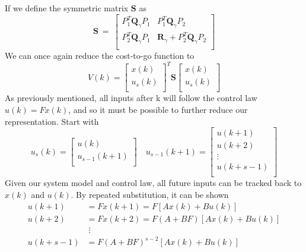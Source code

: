 If we define the symmetric matrix $\textbf{S}$ as
\begin{equation}
    \textbf{S}\ =\ \left[\begin{matrix}P_1^T\textbf{Q}_\gamma P_1&P_1^T\textbf{Q}_\gamma P_2\\P_2^T\textbf{Q}_\gamma P_1&\textbf{R}_\gamma+P_2^T\textbf{Q}_\gamma P_2\\\end{matrix}\right]
\end{equation}
We can once again reduce the cost-to-go function to
\begin{equation}
    V\left(k\right)={\left[\begin{matrix}x\left(k\right)\\u_s\left(k\right)\\\end{matrix}\right]}^T\textbf{S}\left[\begin{matrix}x\left(k\right)\\u_s\left(k\right)\\\end{matrix}\right]
    \label{eq:xus_cost_to_go}
\end{equation}
As previously mentioned, all inputs after k will follow the control law $u\left(k\right)=Fx\left(k\right)$, and so it must be possible to further reduce our representation. Start with
\begin{equation}
    u_s\left(k\right)=\left[\begin{matrix}u\left(k\right)\\u_{s-1}\left(k+1\right)\\\end{matrix}\right]	
    \quad
    u_{s-1}\left(k+1\right)=\left[\begin{matrix}u\left(k+1\right)\\u\left(k+2\right)\\\vdots\\u\left(k+s-1\right)\\\end{matrix}\right]
    \label{eq:u_s_and_u_s_1}
\end{equation}
Given our system model and control law, all future inputs can be tracked back to $x\left(k\right)$ and $u\left(k\right)$. By repeated substitution, it can be shown
\begin{align}
    u(k+1) &= Fx(k+1) = F\left[Ax(k) + Bu(k)\right] \nonumber \\
    u(k+2) &= Fx(k+2) = F(A+BF)\left[Ax(k) + Bu(k)\right] \nonumber \\
    &\; \vdots  \\
    u(k+s-1) &= F{(A+BF)}^{s-2} \left[Ax(k) + Bu(k)\right] \nonumber
    \label{eq:u_dynamics}
\end{align}

